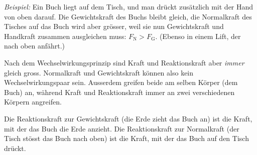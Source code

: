 \begin{center}
\end{center}

\emph{Beispiel:} Ein Buch liegt auf dem Tisch, und man drückt zusätzlich mit der Hand von oben darauf. Die Gewichtskraft des Buchs bleibt gleich, die Normalkraft des Tisches auf das Buch wird aber grösser, weil sie nun Gewichtskraft und Handkraft zusammen ausgleichen muss: $F_\text{N} > F_\text{G}$. (Ebenso in einem Lift, der nach oben anfährt.)

Nach dem Wechselwirkungsprinzip sind Kraft und Reaktionskraft aber \emph{immer} gleich gross. Normalkraft und Gewichtskraft können also kein Wechselwirkungspaar sein. Ausserdem greifen beide am selben Körper (dem Buch) an, während Kraft und Reaktionskraft immer an zwei verschiedenen Körpern angreifen.

Die Reaktionskraft zur Gewichtskraft (die Erde zieht das Buch an) ist die Kraft, mit der das Buch die Erde anzieht. Die Reaktionskraft zur Normalkraft (der Tisch stösst das Buch nach oben) ist die Kraft, mit der das Buch auf den Tisch drückt.

